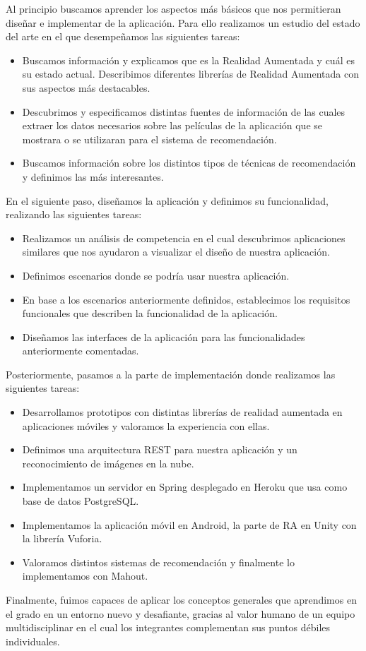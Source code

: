 Al principio buscamos aprender los aspectos más básicos que nos permitieran
 diseñar e implementar de la aplicación. Para ello realizamos un estudio
 del estado del arte en el que desempeñamos las siguientes tareas:
\begin{itemize}  
    \item Buscamos información y explicamos que es la Realidad Aumentada y cuál
     es su estado actual. Describimos diferentes librerías de Realidad Aumentada
     con sus aspectos más destacables.
    \item Descubrimos y especificamos distintas fuentes de información de las
     cuales extraer los datos necesarios sobre las películas de la aplicación
     que se mostrara o se utilizaran para el sistema de recomendación.
    \item Buscamos información sobre los distintos tipos de técnicas de
     recomendación y definimos las más interesantes.
\end{itemize}

En el siguiente paso, diseñamos la aplicación y definimos su funcionalidad,
 realizando las siguientes tareas:
\begin{itemize}
    \item Realizamos un análisis de competencia en el cual descubrimos
     aplicaciones similares que nos ayudaron a visualizar el diseño de nuestra
     aplicación.
    \item Definimos escenarios donde se podría usar nuestra aplicación.
    \item En base a los escenarios anteriormente definidos, establecimos los
     requisitos funcionales que describen la funcionalidad de la aplicación.
    \item Diseñamos las interfaces de la aplicación para las funcionalidades
     anteriormente comentadas.
\end{itemize}

Posteriormente, pasamos a la parte de implementación donde realizamos las
 siguientes tareas:
\begin{itemize}
    \item Desarrollamos prototipos con distintas librerías de realidad
     aumentada en aplicaciones móviles y valoramos la experiencia con ellas.
    \item Definimos una arquitectura REST para nuestra aplicación y un
     reconocimiento de imágenes en la nube.
    \item Implementamos un servidor en Spring desplegado en Heroku que usa como
     base de datos PostgreSQL.
    \item Implementamos la aplicación móvil en Android, la parte de RA en Unity
     con la librería Vuforia.
    \item Valoramos distintos sistemas de recomendación y finalmente lo
     implementamos con Mahout.
\end{itemize}

Finalmente, fuimos capaces de aplicar los conceptos generales que aprendimos
 en el grado en un entorno nuevo y desafiante, gracias al valor humano de
 un equipo multidisciplinar en el cual los integrantes complementan sus
 puntos débiles individuales. 